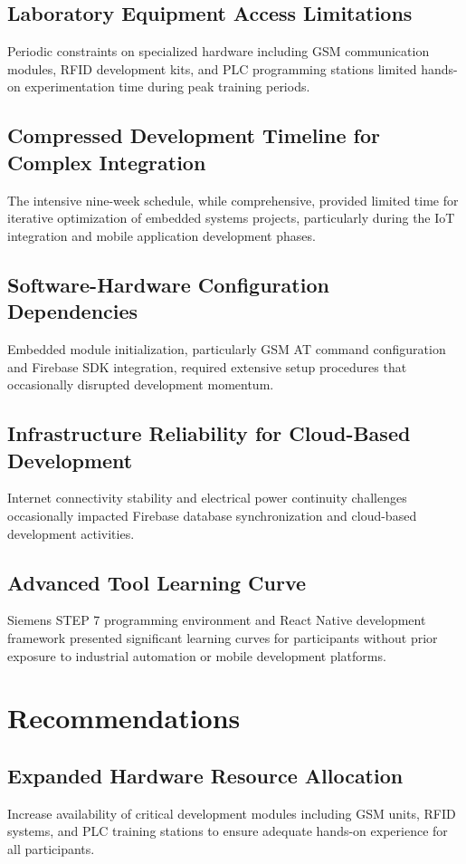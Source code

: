 \documentclass[12pt,a4paper]{report}
\begin{document}
\subsection{Laboratory Equipment Access Limitations}
\noindent Periodic constraints on specialized hardware including GSM communication modules, RFID development kits, and PLC programming stations limited hands-on experimentation time during peak training periods.

\subsection{Compressed Development Timeline for Complex Integration}
\noindent The intensive nine-week schedule, while comprehensive, provided limited time for iterative optimization of embedded systems projects, particularly during the IoT integration and mobile application development phases.

\subsection{Software-Hardware Configuration Dependencies}
\noindent Embedded module initialization, particularly GSM AT command configuration and Firebase SDK integration, required extensive setup procedures that occasionally disrupted development momentum.

\subsection{Infrastructure Reliability for Cloud-Based Development}
\noindent Internet connectivity stability and electrical power continuity challenges occasionally impacted Firebase database synchronization and cloud-based development activities.

\subsection{Advanced Tool Learning Curve}
\noindent Siemens STEP 7 programming environment and React Native development framework presented significant learning curves for participants without prior exposure to industrial automation or mobile development platforms.

\section{Recommendations}

\subsection{Expanded Hardware Resource Allocation}
\noindent Increase availability of critical development modules including GSM units, RFID systems, and PLC training stations to ensure adequate hands-on experience for all participants.
\end{document}
